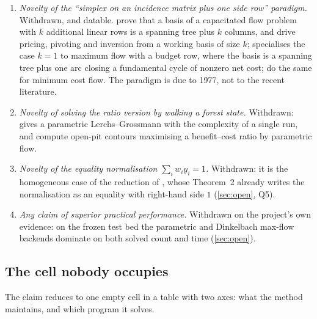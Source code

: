 \begin{enumerate}[label=R\arabic*.,leftmargin=*]
{      max-flow, and of the canonical decomposition.} Withdrawn: classical
      \citep{Picard1976,PicardQueyranne1982,Sidney1975,Lawler1978}.
\item \emph{Novelty of the ``simplex on an incidence matrix plus one side row''
      paradigm.} Withdrawn, and datable. \citet{ChenSaigal1977} prove that a
      basis of a capacitated flow problem with $k$ additional linear rows is a
      spanning tree plus $k$ columns, and drive pricing, pivoting and inversion
      from a working basis of size $k$; \citet{Caliskan2011} specialises the
      case $k=1$ to maximum flow with a budget row, where the basis is a
      spanning tree plus one arc closing a fundamental cycle of nonzero net
      cost; \citet{HolzhauserEtAl2017} do the same for minimum cost flow. The
      paradigm is due to 1977, not to the recent literature.
\item \emph{Novelty of solving the ratio version by walking a forest state.}
      Withdrawn: \citet{Hochbaum2001} gives a parametric Lerchs--Grossmann with
      the complexity of a single run, and \citet{PicardSmith2004} compute
      open-pit contours maximising a benefit--cost ratio by parametric flow.
\item \emph{Novelty of the equality normalisation \(\sum_i w_i y_i = 1\).}
      Withdrawn: it is the homogeneous case of the reduction of
      \citet{CharnesCooper1962}, whose Theorem~2 already writes the
      normalisation as an equality with right-hand side $1$
      (\cref{sec:open}, Q5).
\item \emph{Any claim of superior practical performance.} Withdrawn on the
      project's own evidence: on the frozen test bed the parametric and
      Dinkelbach max-flow backends dominate \FS{} on both solved count and time
      (\cref{sec:open}).
\end{enumerate}

\subsection{The cell nobody occupies}\label{sec:gap}

The claim reduces to one empty cell in a table with two axes: what the method
maintains, and which program it solves.

